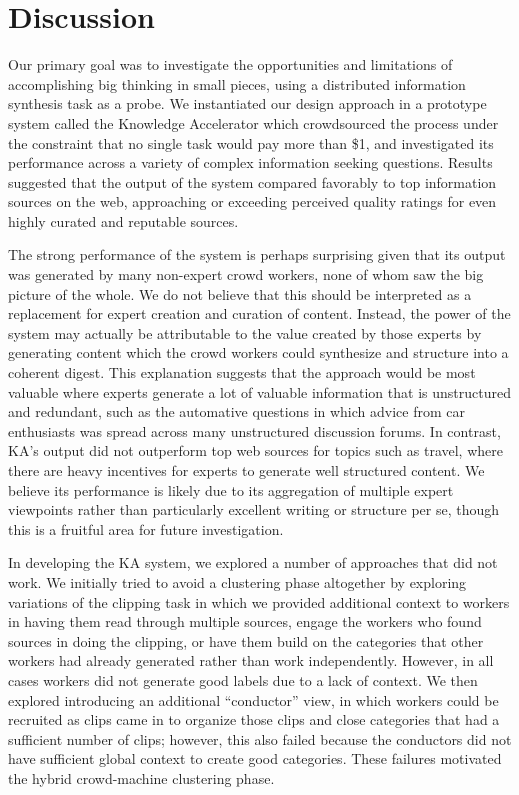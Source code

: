\section{Discussion}

Our primary goal was to investigate the opportunities and limitations of accomplishing big thinking in small pieces, using a distributed information synthesis task as a probe. We instantiated our design approach in a prototype system called the Knowledge Accelerator which crowdsourced the process under the constraint that no single task would pay more than \$1, and investigated its performance across a variety of complex information seeking questions. Results suggested that the output of the system compared favorably to top information sources on the web, approaching or exceeding perceived quality ratings for even highly curated and reputable sources.

The strong performance of the system is perhaps surprising given that its output was generated by many non-expert crowd workers, none of whom saw the big picture of the whole. We do not believe that this should be interpreted as a replacement for expert creation and curation of content. Instead, the power of the system may actually be attributable to the value created by those experts by generating content which the crowd workers could synthesize and structure into a coherent digest. This explanation suggests that the approach would be most valuable where experts generate a lot of valuable information that is unstructured and redundant, such as the automative questions in which advice from car enthusiasts was spread across many unstructured discussion forums. In contrast, KA's output did not outperform top web sources for topics such as travel, where there are heavy incentives for experts to generate well structured content.  We believe its performance is likely due to its aggregation of multiple expert viewpoints rather than particularly excellent writing or structure per se, though this is a fruitful area for future investigation.

In developing the KA system, we explored a number of approaches that did not work. We initially tried to avoid a clustering phase altogether by exploring variations of the clipping task in which we provided additional context to workers in having them read through multiple sources, engage the workers who found sources in doing the clipping, or have them build on the categories that other workers had already generated rather than work independently.  However, in all cases workers did not generate good labels due to a lack of context. We then explored introducing an additional ``conductor'' view, in which workers could be recruited as clips came in to organize those clips and close categories that had a sufficient number of clips; however, this also failed because the conductors did not have sufficient global context to create good categories. These failures motivated the hybrid crowd-machine clustering phase.

